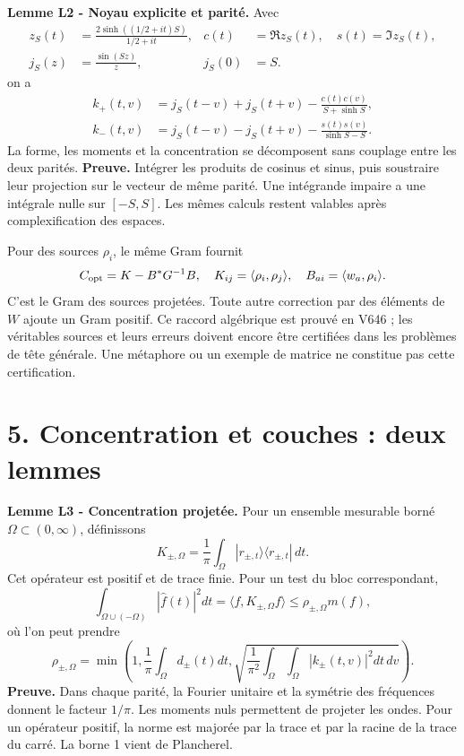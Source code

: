 \documentclass[
  10pt,
  a4paper,
]{article}
\begin{document}
\textbf{Lemme L2 - Noyau explicite et parité.} Avec \[
\begin{aligned}
z_S(t)&=\frac{2\sinh((1/2+it)S)}{1/2+it},
&c(t)&=\Re z_S(t),\quad s(t)=\Im z_S(t),\\
j_S(z)&=\frac{\sin(Sz)}{z},&j_S(0)&=S.
\end{aligned}
\] on a \[
\begin{aligned}
k_+(t,v)&=j_S(t-v)+j_S(t+v)-\frac{c(t)c(v)}{S+\sinh S},\\
k_-(t,v)&=j_S(t-v)-j_S(t+v)-\frac{s(t)s(v)}{\sinh S-S}.
\end{aligned}
\] La forme, les moments et la concentration se décomposent sans
couplage entre les deux parités. \textbf{Preuve.} Intégrer les produits
de cosinus et sinus, puis soustraire leur projection sur le vecteur de
même parité. Une intégrande impaire a une intégrale nulle sur
\([-S,S]\). Les mêmes calculs restent valables après complexification
des espaces.

Pour des sources \(\rho_i\), le même Gram fournit \[
C_{\rm opt}=K-B^*G^{-1}B,
\quad K_{ij}=\langle\rho_i,\rho_j\rangle,
\quad B_{ai}=\langle w_a,\rho_i\rangle.
\] C'est le Gram des sources projetées. Toute autre correction par des
éléments de \(W\) ajoute un Gram positif. Ce raccord algébrique est
prouvé en V646 ; les véritables sources et leurs erreurs doivent encore
être certifiées dans les problèmes de tête générale. Une métaphore ou un
exemple de matrice ne constitue pas cette certification.

\hypertarget{concentration-et-couches-deux-lemmes}{%
\section{5. Concentration et couches : deux
lemmes}\label{concentration-et-couches-deux-lemmes}}

\textbf{Lemme L3 - Concentration projetée.} Pour un ensemble mesurable
borné \(\Omega\subset(0,\infty)\), définissons \[
K_{\pm,\Omega}=\frac1\pi\int_\Omega
|r_{\pm,t}\rangle\langle r_{\pm,t}|\,dt.
\] Cet opérateur est positif et de trace finie. Pour un test du bloc
correspondant, \[
\int_{\Omega\cup(-\Omega)}|\widehat f(t)|^2dt
=\langle f,K_{\pm,\Omega}f\rangle
\le\rho_{\pm,\Omega}m(f),
\] où l'on peut prendre \[
\rho_{\pm,\Omega}=\min\left(1,\frac1\pi\int_\Omega d_\pm(t)dt,
\sqrt{\frac1{\pi^2}\int_\Omega\!\int_\Omega|k_\pm(t,v)|^2dt\,dv}\right).
\] \textbf{Preuve.} Dans chaque parité, la Fourier unitaire et la
symétrie des fréquences donnent le facteur \(1/\pi\). Les moments nuls
permettent de projeter les ondes. Pour un opérateur positif, la norme
est majorée par la trace et par la racine de la trace du carré. La borne
1 vient de Plancherel.
\end{document}
